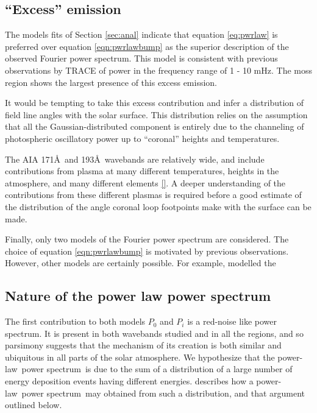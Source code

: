 \documentclass[preprint]{../aastex52/aastex}
\newcommand{\PS}{power spectrum}
\newcommand{\PL}{power-law}
\begin{document}
\subsection{``Excess'' emission}\label{ssec:excess}
The models fits of Section \ref{sec:anal} indicate that equation
\ref{eq:pwrlaw} is preferred over equation \ref{eqn:pwrlawbump} as the
superior description of the observed Fourier power spectrum.  This
model is consistent with previous observations by TRACE of power in
the frequency range of 1 - 10 mHz.  The moss region shows the largest
presence of this excess emission.

It would be tempting to take this excess contribution and infer a
distribution of field line angles with the solar surface.  This
distribution relies on the assumption that all the
Gaussian-distributed component is entirely due to the channeling of
photospheric oscillatory power up to ``coronal'' heights and
temperatures.


The AIA 171\AA\ and 193\AA\ wavebands are relatively wide, and include
contributions from plasma at many different temperatures, heights in
the atmosphere, and many different elements \ref{}.  A deeper
understanding of the contributions from these different plasmas is
required before a good estimate of the distribution of the angle
coronal loop footpoints make with the surface can be made.

Finally, only two models of the Fourier power spectrum are considered.
The choice of equation \ref{eqn:pwrlawbump} is motivated by previous
observations.  However, other models are certainly possible.  For
example, \cite{1993ASPC...42..111H} modelled the


\subsection{Nature of the power law power spectrum}\label{ssec:nplps}
The first contribution to both models $P_{0}$ and $P_{i}$ is a
red-noise like power spectrum.  It is present in both wavebands
studied and in all the regions, and so parsimony suggests that the
mechanism of its creation is both similar and ubiquitous in all parts
of the solar atmosphere.  We hypothesize that the \PL\ \PS\ is due to
the sum of a distribution of a large number of energy deposition
events having different energies. \cite{} describes how a
\PL\ \PS\ may obtained from such a distribution, and that argument
outlined below.
\end{document}
